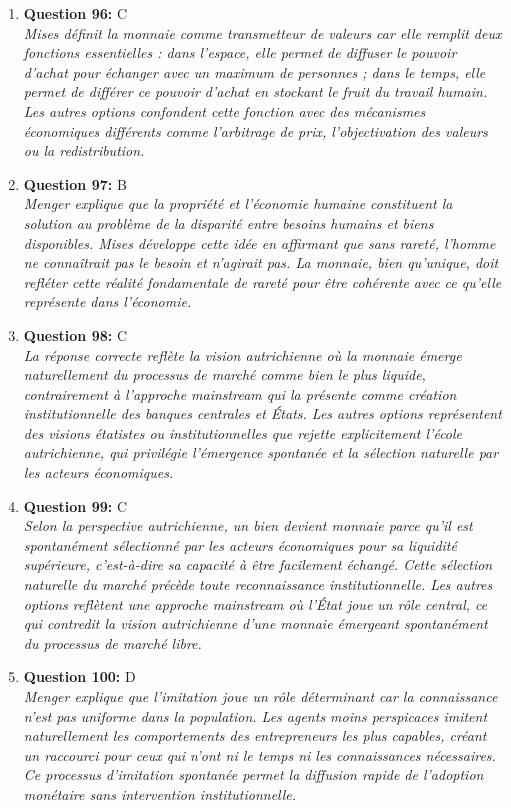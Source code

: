 \documentclass[12pt,a4paper]{article}
\begin{document}
\begin{enumerate}
\item \textbf{Question 96:} C
\\ \textit{Mises définit la monnaie comme transmetteur de valeurs car elle remplit deux fonctions essentielles : dans l'espace, elle permet de diffuser le pouvoir d'achat pour échanger avec un maximum de personnes ; dans le temps, elle permet de différer ce pouvoir d'achat en stockant le fruit du travail humain. Les autres options confondent cette fonction avec des mécanismes économiques différents comme l'arbitrage de prix, l'objectivation des valeurs ou la redistribution.}

\item \textbf{Question 97:} B
\\ \textit{Menger explique que la propriété et l'économie humaine constituent la solution au problème de la disparité entre besoins humains et biens disponibles. Mises développe cette idée en affirmant que sans rareté, l'homme ne connaîtrait pas le besoin et n'agirait pas. La monnaie, bien qu'unique, doit refléter cette réalité fondamentale de rareté pour être cohérente avec ce qu'elle représente dans l'économie.}

\item \textbf{Question 98:} C
\\ \textit{La réponse correcte reflète la vision autrichienne où la monnaie émerge naturellement du processus de marché comme bien le plus liquide, contrairement à l'approche mainstream qui la présente comme création institutionnelle des banques centrales et États. Les autres options représentent des visions étatistes ou institutionnelles que rejette explicitement l'école autrichienne, qui privilégie l'émergence spontanée et la sélection naturelle par les acteurs économiques.}

\item \textbf{Question 99:} C
\\ \textit{Selon la perspective autrichienne, un bien devient monnaie parce qu'il est spontanément sélectionné par les acteurs économiques pour sa liquidité supérieure, c'est-à-dire sa capacité à être facilement échangé. Cette sélection naturelle du marché précède toute reconnaissance institutionnelle. Les autres options reflètent une approche mainstream où l'État joue un rôle central, ce qui contredit la vision autrichienne d'une monnaie émergeant spontanément du processus de marché libre.}

\item \textbf{Question 100:} D
\\ \textit{Menger explique que l'imitation joue un rôle déterminant car la connaissance n'est pas uniforme dans la population. Les agents moins perspicaces imitent naturellement les comportements des entrepreneurs les plus capables, créant un raccourci pour ceux qui n'ont ni le temps ni les connaissances nécessaires. Ce processus d'imitation spontanée permet la diffusion rapide de l'adoption monétaire sans intervention institutionnelle.}


\end{enumerate}
\end{document}

